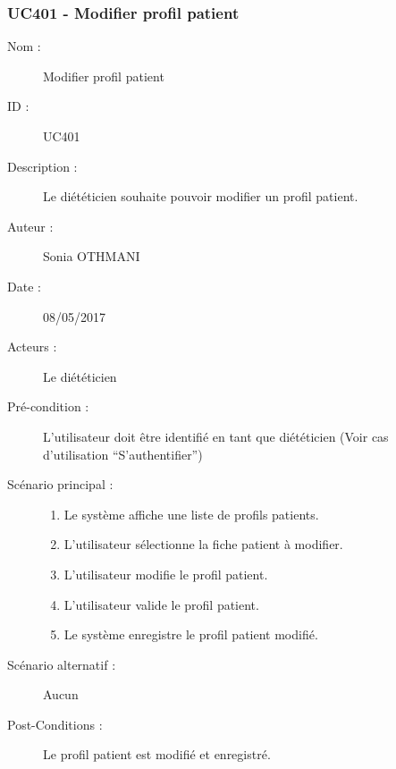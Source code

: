 \subsubsection{UC401 - Modifier profil patient}
\begin{description}
\item [Nom :] Modifier profil patient
\item [ID :] UC401
\item [Description :] Le diététicien souhaite pouvoir modifier un profil patient.
\item [Auteur :] Sonia OTHMANI
\item [Date :] 08/05/2017
\item [Acteurs :] Le diététicien
\item [Pré-condition :] L’utilisateur doit être identifié en tant que diététicien (Voir cas d’utilisation \enquote{S’authentifier})
\item [Scénario principal :]
  \begin{enumerate}
  \item Le système affiche une liste de profils patients.
  \item L’utilisateur sélectionne la fiche patient à modifier.
  \item L’utilisateur modifie le profil patient.
  \item L’utilisateur valide le profil patient.
  \item Le système enregistre le profil patient modifié.
  \end{enumerate}
\item [Scénario alternatif :] Aucun
\item [Post-Conditions :] Le profil patient est modifié et enregistré.
\end{description}

